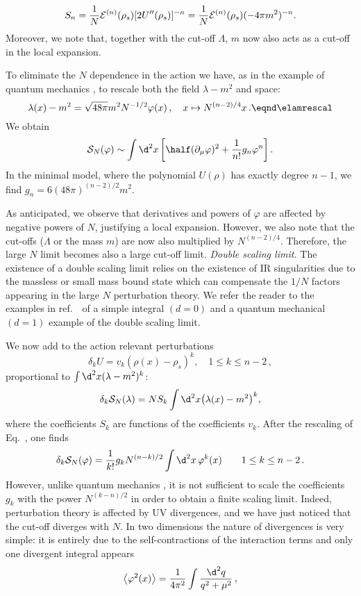$$S_n={1\over N}{\cal E}^{(n)}(\rho_s)[2U''(\rho_s)]^{-n}={1\over N}{\cal E}^{(n)}(\rho_s)(-4\pi m^2)^{-n} .$$
Moreover,  we note that, together with the cut-off $\Lambda$, $m$
now also acts as a cut-off in the local expansion. \par
To eliminate the $N$ dependence in the action we have, as in the
example of quantum mechanics \rEMNZJ, to rescale both the field
$\lambda-m^2$ and space:
%
$$\lambda(x)-m^2=\sqrt{48\pi}m^2 N^{-1/2}\varphi(x)\,,\quad x\mapsto
N^{(n-2)/4}x \,.
\eqnd\elamrescal $$
We obtain
$${\cal S}_N(\varphi)
\sim\int\d^2x\left[\half(\partial_\mu\varphi)^2+\frac{1}{n!} g_n
\varphi^n\right] .$$
In the minimal model, where the polynomial $U(\rho)$ has exactly degree $n-1$,
we find $g_n=6(48\pi)^{(n-2)/2}m^2$.

As anticipated, we observe that derivatives and powers of
$\varphi$ are affected by negative powers of $N$, justifying a
local expansion. However, we also note that the cut-offs
($\Lambda$  or the mass $m$) are now also multiplied by
$N^{(n-2)/4}$. Therefore, the large $N$ limit becomes also a large
cut-off limit.
\medskip
{\it Double scaling limit.} The existence of a double scaling
limit relies on the existence of IR singularities due to the
massless or small mass bound state which can compensate the $1/N$
factors appearing in the large $N$ perturbation theory. We refer
the reader to the examples in ref.~\rEMNZJ\ of a simple integral
$(d=0)$ and a quantum mechanical $(d=1)$ example of the double
scaling limit.
\par
 We now add to the action relevant perturbations
$$\delta_k U=v_k(\rho(x)-\rho_s)^k,  \quad 1\le k\le n-2\,,$$
proportional to $\int\d^2x(\lambda-m^2)^k$:
$$\delta_k {\cal S}_N(\lambda)=N S_k \int\d^2x \bigl(\lambda(x)-m^2\bigr)^k ,$$
where the coefficients $S_k$ are functions of the coefficients
$v_k$. After the rescaling of Eq.~\elamrescal, one finds
$$\delta_k {\cal S}_N(\varphi)=\frac{1}{k!} g_k
N^{(n-k)/2}\int\d^2x\,\varphi^k(x)  \quad \ \ \ 1\le k\le n-2\,.
$$
However, unlike quantum mechanics \rEMNZJ, it is not sufficient to
scale the coefficients $g_k$ with the power $N^{(k-n)/2}$ in order
to obtain a finite scaling limit. Indeed, perturbation theory is
affected by UV divergences, and we have just noticed that the
cut-off diverges with $N$. In two dimensions the nature of
divergences is very simple: it is entirely due to the
self-contractions of the interaction terms and only one divergent
integral appears
$$\left<\varphi^2(x)\right>={1\over4\pi^2}\int {\d^2 q\over q^2+\mu^2}\,,$$
